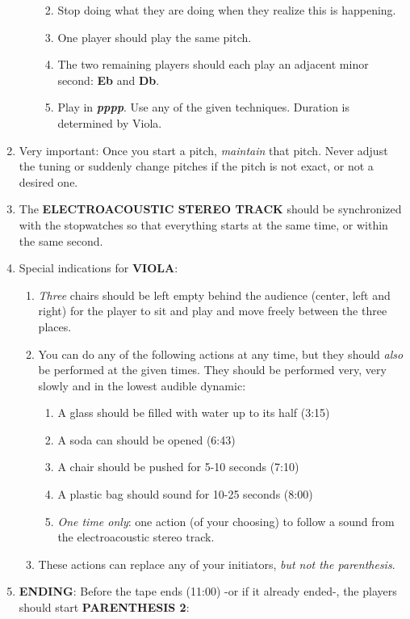 \begin{enumerate}
\begin{enumerate}
    \begin{enumerate}
    \def\labelenumiii{\arabic{enumiii}.}
    \item
      Stop doing what they are doing when they realize this is
      happening.
    \item
      One player should play the same pitch.
    \item
      The two remaining players should each play an adjacent minor
      second: \textbf{Eb} and \textbf{Db}.
    \item
      Play in \emph{\textbf{pppp}}. Use any of the given techniques.
      Duration is determined by Viola.
    \end{enumerate}
  \end{enumerate}
\item
  Very important: Once you start a pitch, \emph{maintain} that pitch.
  Never adjust the tuning or suddenly change pitches if the pitch is not
  exact, or not a desired one.
\item
  The \textbf{ELECTROACOUSTIC STEREO TRACK} should be synchronized with
  the stopwatches so that everything starts at the same time, or within
  the same second.
\item
  Special indications for \textbf{VIOLA}:

  \begin{enumerate}
  \def\labelenumii{\arabic{enumii}.}
  \item
    \emph{Three} chairs should be left empty behind the audience
    (center, left and right) for the player to sit and play and move
    freely between the three places.
  \item
    You can do any of the following actions at any time, but they should
    \emph{also} be performed at the given times. They should be
    performed very, very slowly and in the lowest audible dynamic:

    \begin{enumerate}
    \def\labelenumiii{\arabic{enumiii}.}
    \item
      A glass should be filled with water up to its half (3:15)
    \item
      A soda can should be opened (6:43)
    \item
      A chair should be pushed for 5-10 seconds (7:10)
    \item
      A plastic bag should sound for 10-25 seconds (8:00)
    \item
      \emph{One time only}: one action (of your choosing) to follow a
      sound from the electroacoustic stereo track.
    \end{enumerate}
  \item
    These actions can replace any of your initiators, \emph{but not the
    parenthesis}.
  \end{enumerate}
\item
  \textbf{ENDING}: Before the tape ends (11:00) -or if it already
  ended-, the players should start \textbf{PARENTHESIS 2}:


\end{enumerate}
